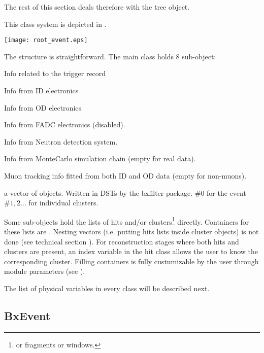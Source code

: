 The rest of this section deals therefore with the tree object.

This class system is depicted in . 

\bfig 
\texttt{[image: root\_event.eps]}
\efig
  
The structure is straightforward. The main class  holds 8 sub-object:
\ben
\item {} Info related to the trigger record
\item {} Info from ID electronics
\item {} Info from OD electronics
\item {} Info from FADC electronics (disabled).
\item {} Info from Neutron detection system.
\item {} Info from MonteCarlo simulation chain (empty for real data).
\item {} Muon tracking info fitted from both ID and OD data (empty for non-muons).
\item a vector of  objects. Written in DSTs by the bxfilter package. $\#0$ for the event $\#1,2\ldots$ for individual clusters.
\een

Some sub-objects hold the lists of hits and/or clusters\footnote{or fragments or windows.} directly.
Containers for these lists are .
Nesting vectors (i.e. putting hits lists inside cluster objects) is not done (see technical section ).
For reconstruction stages where both hits and clusters are present, an index variable in the hit class allows the user to know the corresponding cluster. 
Filling containers is fully custumizable by the user through  module parameters (see ).

The list of physical variables in every class will be described next.


\subsection{BxEvent}

